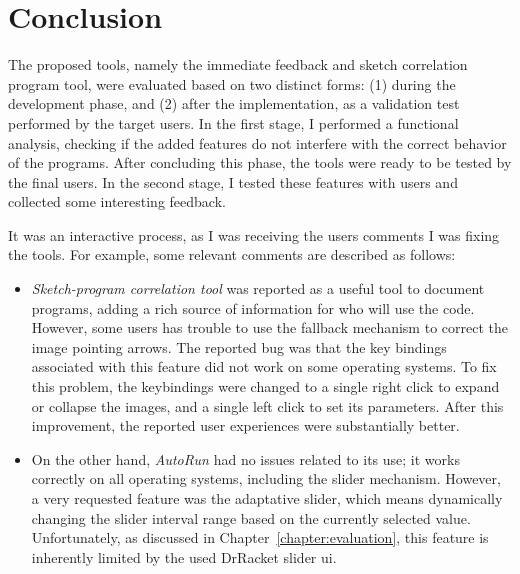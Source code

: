 \section{Conclusion}
\label{sec:eval}

The proposed tools, namely the immediate feedback and sketch correlation program tool, were evaluated based on two distinct forms: (1) during the development phase, and (2) after the implementation, as a validation test performed by the target users. In the first stage, I performed a functional analysis, checking if the added features do not interfere with the correct behavior of the programs. After concluding this phase, the tools were ready to be tested by the final users. In the second stage, I tested these features with users and collected some interesting feedback. 

It was an interactive process, as I was receiving the users comments I was fixing the tools. For example, some relevant comments are described as follows:

\begin{itemize}
\item \textit{Sketch-program correlation tool} was reported as a useful tool to document programs, adding a rich source of information for who will use the code. However, some users has trouble to use the fallback mechanism to correct the image pointing arrows. The reported bug was that the key bindings associated with this feature did not work on some operating systems. To fix this problem, the keybindings were changed to a single right click to expand or collapse the images, and a single left click to set its parameters. After this improvement, the reported user experiences were substantially better.

\item On the other hand, \textit{AutoRun} had no issues related to its use; it works correctly on all operating systems, including the slider mechanism. However, a very requested feature was the adaptative slider, which means dynamically changing the slider interval range based on the currently selected value. Unfortunately, as discussed in Chapter~\ref{chapter:evaluation}, this feature is inherently limited by the used DrRacket slider \gls{ui}.
\end{itemize}
